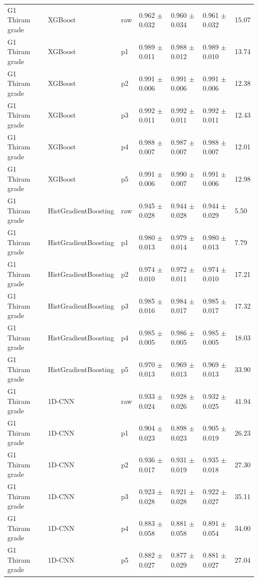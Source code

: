 {\begin{longtable}{L{2.35cm}L{2.4cm}L{1.0cm}L{2.35cm}L{2.25cm}L{2.25cm}L{1.45cm}}
G1 Thiram grade & XGBoost & raw & 0.962 $\pm$ 0.032 & 0.960 $\pm$ 0.034 & 0.961 $\pm$ 0.032 & 15.07 \\
G1 Thiram grade & XGBoost & p1 & 0.989 $\pm$ 0.011 & 0.988 $\pm$ 0.012 & 0.989 $\pm$ 0.010 & 13.74 \\
G1 Thiram grade & XGBoost & p2 & 0.991 $\pm$ 0.006 & 0.991 $\pm$ 0.006 & 0.991 $\pm$ 0.006 & 12.38 \\
G1 Thiram grade & XGBoost & p3 & 0.992 $\pm$ 0.011 & 0.992 $\pm$ 0.011 & 0.992 $\pm$ 0.011 & 12.43 \\
G1 Thiram grade & XGBoost & p4 & 0.988 $\pm$ 0.007 & 0.987 $\pm$ 0.007 & 0.988 $\pm$ 0.007 & 12.01 \\
G1 Thiram grade & XGBoost & p5 & 0.991 $\pm$ 0.006 & 0.990 $\pm$ 0.007 & 0.991 $\pm$ 0.006 & 12.98 \\
G1 Thiram grade & HistGradientBoosting & raw & 0.945 $\pm$ 0.028 & 0.944 $\pm$ 0.028 & 0.944 $\pm$ 0.029 & 5.50 \\
G1 Thiram grade & HistGradientBoosting & p1 & 0.980 $\pm$ 0.013 & 0.979 $\pm$ 0.014 & 0.980 $\pm$ 0.013 & 7.79 \\
G1 Thiram grade & HistGradientBoosting & p2 & 0.974 $\pm$ 0.010 & 0.972 $\pm$ 0.011 & 0.974 $\pm$ 0.010 & 17.21 \\
G1 Thiram grade & HistGradientBoosting & p3 & 0.985 $\pm$ 0.016 & 0.984 $\pm$ 0.017 & 0.985 $\pm$ 0.017 & 17.32 \\
G1 Thiram grade & HistGradientBoosting & p4 & 0.985 $\pm$ 0.005 & 0.986 $\pm$ 0.005 & 0.985 $\pm$ 0.005 & 18.03 \\
G1 Thiram grade & HistGradientBoosting & p5 & 0.970 $\pm$ 0.013 & 0.969 $\pm$ 0.013 & 0.969 $\pm$ 0.013 & 33.90 \\
G1 Thiram grade & 1D-CNN & raw & 0.933 $\pm$ 0.024 & 0.928 $\pm$ 0.026 & 0.932 $\pm$ 0.025 & 41.94 \\
G1 Thiram grade & 1D-CNN & p1 & 0.904 $\pm$ 0.023 & 0.898 $\pm$ 0.023 & 0.905 $\pm$ 0.019 & 26.23 \\
G1 Thiram grade & 1D-CNN & p2 & 0.936 $\pm$ 0.017 & 0.931 $\pm$ 0.019 & 0.935 $\pm$ 0.018 & 27.30 \\
G1 Thiram grade & 1D-CNN & p3 & 0.923 $\pm$ 0.028 & 0.921 $\pm$ 0.028 & 0.922 $\pm$ 0.027 & 35.11 \\
G1 Thiram grade & 1D-CNN & p4 & 0.883 $\pm$ 0.058 & 0.881 $\pm$ 0.058 & 0.891 $\pm$ 0.054 & 34.00 \\
G1 Thiram grade & 1D-CNN & p5 & 0.882 $\pm$ 0.027 & 0.877 $\pm$ 0.029 & 0.881 $\pm$ 0.027 & 27.04 \\

\end{longtable}}
